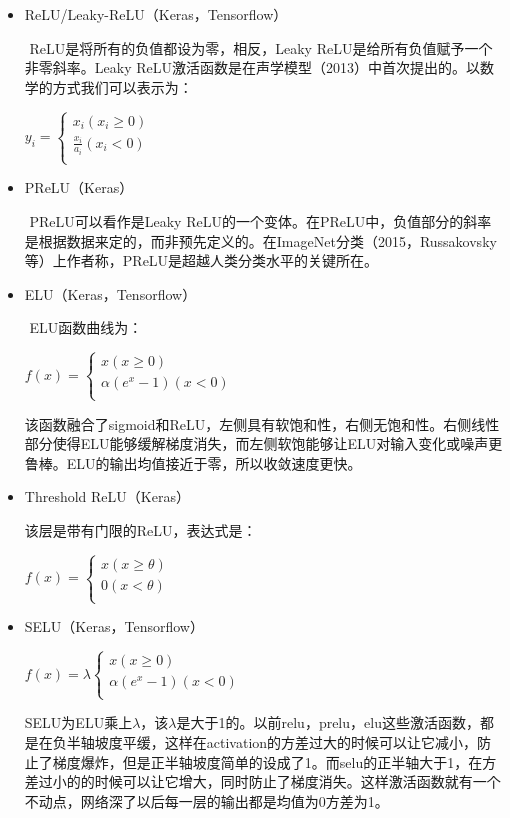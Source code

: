 \documentclass{progbookcn}
\begin{document}
\begin{itemize}
\item ReLU/Leaky-ReLU（Keras，Tensorflow）

  ​	ReLU是将所有的负值都设为零，相反，Leaky ReLU是给所有负值赋予一个非零斜率。Leaky ReLU激活函数是在声学模型（2013）中首次提出的。以数学的方式我们可以表示为：

  ​						 $y_i=\begin{cases}
  x_i (x_i\geq 0)\\
  \frac{x_i}{a_i} (x_i< 0)\\
  \end{cases}$

\item PReLU（Keras）

  ​	PReLU可以看作是Leaky ReLU的一个变体。在PReLU中，负值部分的斜率是根据数据来定的，而非预先定义的。在ImageNet分类（2015，Russakovsky等）上作者称，PReLU是超越人类分类水平的关键所在。

\item ELU（Keras，Tensorflow）

  ​	ELU函数曲线为：

  ​					$f(x)=\begin{cases}
  x (x\geq 0)\\
  \alpha(e^x-1) (x< 0)\\
  \end{cases}$

  该函数融合了sigmoid和ReLU，左侧具有软饱和性，右侧无饱和性。右侧线性部分使得ELU能够缓解梯度消失，而左侧软饱能够让ELU对输入变化或噪声更鲁棒。ELU的输出均值接近于零，所以收敛速度更快。

\item Threshold ReLU（Keras）

  该层是带有门限的ReLU，表达式是：

  ​						$f(x)=\begin{cases}
  x (x\geq \theta)\\
  0 (x<  \theta)\\
  \end{cases}$

\item SELU（Keras，Tensorflow）

  ​					$f(x)=\lambda\begin{cases}
  x (x\geq 0)\\
  \alpha(e^x-1) (x< 0)\\
  \end{cases}$

  ​	SELU为ELU乘上$\lambda$，该$\lambda$是大于1的。以前relu，prelu，elu这些激活函数，都是在负半轴坡度平缓，这样在activation的方差过大的时候可以让它减小，防止了梯度爆炸，但是正半轴坡度简单的设成了1。而selu的正半轴大于1，在方差过小的的时候可以让它增大，同时防止了梯度消失。这样激活函数就有一个不动点，网络深了以后每一层的输出都是均值为0方差为1。


\end{itemize}
\end{document}
